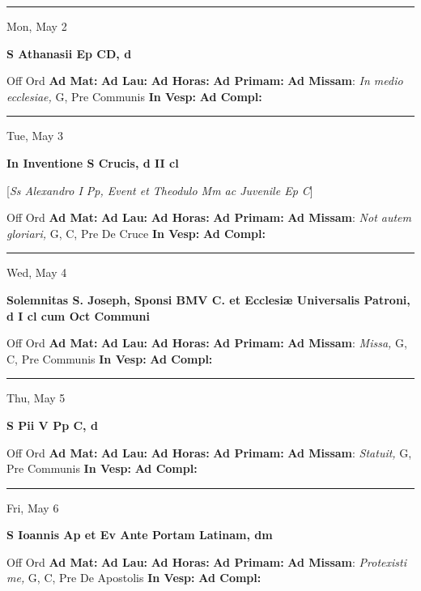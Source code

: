 \documentclass[letterpaper, 10pt]{article}
\begin{document}
\hrule
\begin{center}
Mon, May 2
\end{center}\textbf{ \large S Athanasii Ep CD, \textnormal{\normalsize d}}
\begin{justify}
Off Ord
\textbf{Ad Mat: }
\textbf{Ad Lau: }
\textbf{Ad Horas: }
\textbf{Ad Primam: }
\textbf{Ad Missam}: \textit{In medio ecclesiae,} G, Pre Communis
\textbf{In Vesp: }
\textbf{Ad Compl: }\end{justify}



\hrule
\begin{center}
Tue, May 3
\end{center}\textbf{ \large In Inventione S Crucis, \textnormal{\normalsize d II cl}}

[\textit{Ss Alexandro I Pp, Event et Theodulo Mm ac Juvenile Ep C}]
\begin{justify}
Off Ord
\textbf{Ad Mat: }
\textbf{Ad Lau: }
\textbf{Ad Horas: }
\textbf{Ad Primam: }
\textbf{Ad Missam}: \textit{Not autem gloriari,} G, C, Pre De Cruce
\textbf{In Vesp: }
\textbf{Ad Compl: }\end{justify}



\hrule
\begin{center}
Wed, May 4
\end{center}\textbf{ \large Solemnitas S. Joseph, Sponsi BMV C. et Ecclesiæ Universalis Patroni, \textnormal{\normalsize d I cl cum Oct Communi}}
\begin{justify}
Off Ord
\textbf{Ad Mat: }
\textbf{Ad Lau: }
\textbf{Ad Horas: }
\textbf{Ad Primam: }
\textbf{Ad Missam}: \textit{Missa,} G, C, Pre Communis
\textbf{In Vesp: }
\textbf{Ad Compl: }\end{justify}



\hrule
\begin{center}
Thu, May 5
\end{center}\textbf{ \large S Pii V Pp C, \textnormal{\normalsize d}}
\begin{justify}
Off Ord
\textbf{Ad Mat: }
\textbf{Ad Lau: }
\textbf{Ad Horas: }
\textbf{Ad Primam: }
\textbf{Ad Missam}: \textit{Statuit,} G, Pre Communis
\textbf{In Vesp: }
\textbf{Ad Compl: }\end{justify}



\hrule
\begin{center}
Fri, May 6
\end{center}\textbf{ \large S Ioannis Ap et Ev Ante Portam Latinam, \textnormal{\normalsize dm}}
\begin{justify}
Off Ord
\textbf{Ad Mat: }
\textbf{Ad Lau: }
\textbf{Ad Horas: }
\textbf{Ad Primam: }
\textbf{Ad Missam}: \textit{Protexisti me,} G, C, Pre De Apostolis
\textbf{In Vesp: }
\textbf{Ad Compl: }\end{justify}
\end{document}
